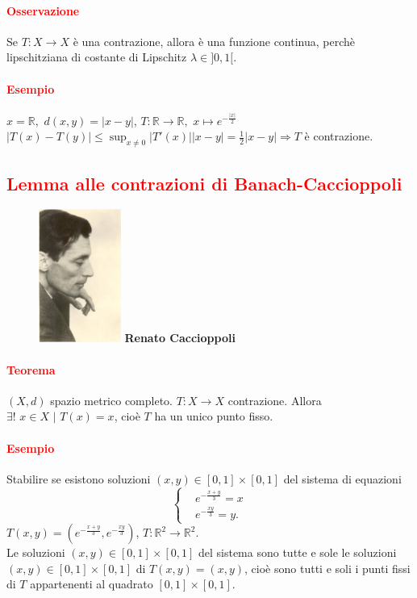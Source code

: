 \documentclass{article}
\newcommand{\R}{\mathbb{R}}
\begin{document}
\paragraph{\textcolor{red}{Osservazione}}
Se $T:X \rightarrow X$ è una contrazione, allora è una funzione continua, perchè lipschitziana di costante di Lipschitz $\lambda \in ]0,1[$.

\paragraph{\textcolor{red}{Esempio}}
$x=\R,\,\, d(x,y)=|x-y|$, $T:\R \rightarrow \R, \,\, x \mapsto e^{-\frac{|x|}{2}}$\\
$|T(x)-T(y)|\leq \sup_{x \neq 0}|T'(x)||x-y|=\frac{1}{2}|x-y| \Rightarrow T$ è contrazione.  

\subsection{\textcolor{red}{Lemma alle contrazioni di Banach-Caccioppoli}}
\begin{figure}
    \centering
    \includegraphics[width=0.24\textwidth]{Caccioppoli.jpg}
    \textbf{\small{Renato Caccioppoli}}
\end{figure}
\paragraph{\textcolor{red}{Teorema}}
$(X,d)$ spazio metrico completo. $T:X \rightarrow X$ contrazione. Allora $\exists! \,\, x \in X \,\, | \,\, T(x) = x$, cioè $T$ ha un unico punto fisso.

\paragraph{\textcolor{red}{Esempio}}
Stabilire se esistono soluzioni $(x,y)\in[0,1]\times[0,1]$ del sistema di equazioni
\begin{equation*}
    \begin{cases}
        &e^{-\frac{x+y}{3}}=x\\
        &e^{-\frac{xy}{3}}=y.
    \end{cases}
\end{equation*}
$T(x,y)=(e^{-\frac{x+y}{3}},e^{-\frac{xy}{3}})$, $T: \R^2 \rightarrow \R^2$.\\
Le soluzioni $(x,y)\in [0,1]\times[0,1]$ del sistema sono tutte e sole le soluzioni $(x,y)\in [0,1]\times[0,1]$ di $T(x,y)=(x,y)$, cioè sono tutti e soli i punti fissi di $T$ appartenenti al quadrato $[0,1]\times[0,1]$.
\end{document}
